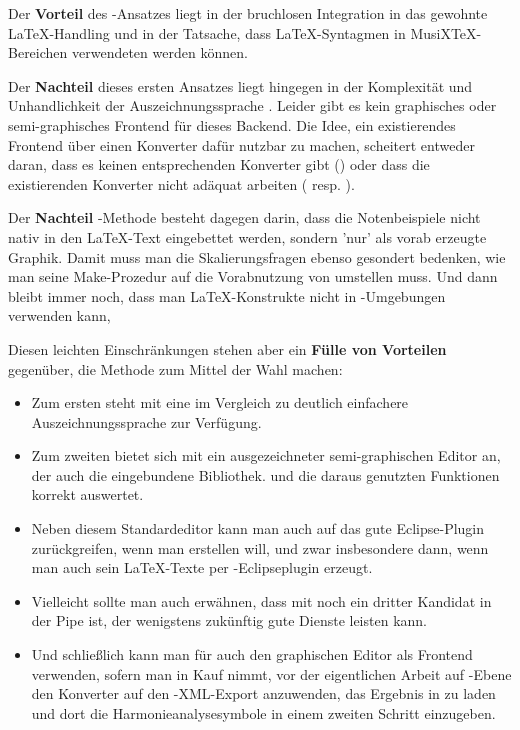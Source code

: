 Der \textbf{Vorteil} des -Ansatzes liegt in der bruchlosen
Integration in das gewohnte \LaTeX-Handling und in der Tatsache, dass
\LaTeX-Syntagmen in MusiX\TeX-Bereichen verwendeten werden können.

Der \textbf{Nachteil} dieses ersten Ansatzes liegt hingegen in der Komplexität und
Unhandlichkeit der Auszeichnungssprache . Leider gibt es kein
graphisches oder semi-graphisches Frontend für dieses Backend. Die Idee, ein
existierendes Frontend über einen Konverter dafür nutzbar zu machen, scheitert
entweder daran, dass es keinen entsprechenden Konverter gibt ()
oder dass die existierenden Konverter nicht adäquat arbeiten ( resp.
).

Der \textbf{Nachteil} -Methode besteht dagegen darin,
dass die Notenbeispiele nicht nativ in den \LaTeX-Text eingebettet werden,
sondern 'nur' als vorab erzeugte Graphik. Damit muss man die Skalierungsfragen
ebenso gesondert bedenken, wie man seine Make-Prozedur auf die Vorabnutzung von
 umstellen muss. Und dann bleibt immer noch, dass man
\LaTeX-Konstrukte nicht in -Umgebungen verwenden kann,

Diesen leichten Einschränkungen stehen aber ein \textbf{Fülle von Vorteilen}
gegenüber, die Methode  zum Mittel der
Wahl machen:

\begin{itemize}
  \item Zum ersten steht mit  eine im Vergleich zu 
  deutlich einfachere Auszeichnungssprache zur Verfügung.
  \item Zum zweiten bietet sich mit  ein ausgezeichneter
  semi-graphischen Editor an, der auch die eingebundene Bibliothek.
    und die daraus genutzten Funktionen korrekt auswertet.
  \item Neben diesem Standardeditor kann man auch auf das gute Eclipse-Plugin
   zurückgreifen, wenn man  erstellen will, und zwar
  insbesondere dann, wenn man auch sein \LaTeX-Texte per
  -Eclipseplugin erzeugt.
  \item Vielleicht sollte man auch erwähnen, dass mit  noch ein
  dritter Kandidat in der Pipe ist, der wenigstens zukünftig gute Dienste
  leisten kann.
  \item Und schließlich kann man für  auch den graphischen Editor
   als Frontend verwenden, sofern man in Kauf nimmt, vor der
  eigentlichen Arbeit auf -Ebene den Konverter
   auf den -XML-Export anzuwenden, das Ergebnis
  in  zu laden und dort die Harmonieanalysesymbole in einem
  zweiten Schritt einzugeben.
\end{itemize}

